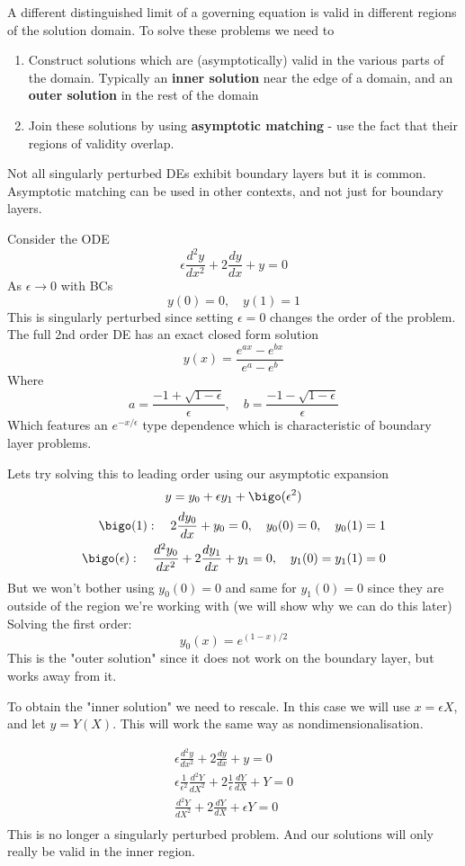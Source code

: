 \documentclass{/home/janmebows/Documents/LatexTemplates/myassignment}
\begin{document}
A different distinguished limit of a governing equation is valid in different regions of the solution domain. To solve these problems we need to
\begin{enumerate}
    \item Construct solutions which are (asymptotically) valid in the various parts of the domain. Typically an \textbf{inner solution} near the edge of a domain, and an \textbf{outer solution} in the rest of the domain
    \item Join these solutions by using \textbf{asymptotic matching} - use the fact that their regions of validity overlap.
    
\end{enumerate}
Not all singularly perturbed DEs exhibit boundary layers but it is common. Asymptotic matching can be used in other contexts, and not just for boundary layers.

Consider the ODE
\[\epsilon \frac{d^2y}{dx^2} + 2\frac{dy}{dx} +y =0\]
As $\epsilon \to 0$ with BCs
\[y(0) = 0,\quad y(1)=1\]
This is singularly perturbed since setting $\epsilon = 0$ changes the order of the problem.
The full 2nd order DE has an exact closed form solution
\[y(x) = \frac{e^{ax} - e^{bx}}{e^a - e^b}\]
Where
\[a = \frac{-1+\sqrt{1-\epsilon}}\epsilon , \quad b = \frac{-1-\sqrt{1-\epsilon}}\epsilon \]
Which features an $e^{-x/\epsilon}$ type dependence which is characteristic of boundary layer problems.

Lets try solving this to leading order using our asymptotic expansion
\[y = y_0 + \epsilon y_1 + \bigo(\epsilon^2)\]
\begin{align*}
    \bigo(1):\quad 2 \frac{dy_0}{dx} + y_0 = 0,\quad y_0(0) = 0,\quad y_0(1)=1\\
    \bigo(\epsilon):\quad \frac{d^2y_0}{dx^2} + 2 \frac{dy_1}{dx} + y_1 = 0,\quad y_1(0)=y_1(1)=0
\end{align*}
But we won't bother using $y_0(0)=0$ and same for $y_1(0)=0$ since they are outside of the region we're working with (we will show why we can do this later)
Solving the first order:
\[y_0(x) = e^{(1-x)/2}\]
This is the "outer solution" since it does not work on the boundary layer, but works away from it.

To obtain the "inner solution" we need to rescale. In this case we will use $x = \epsilon X$, and let $y = Y(X)$. This will work the same way as nondimensionalisation.

\begin{align*}
    \epsilon \frac{d^2y}{dx^2} + 2\frac{dy}{dx} + y= 0\\
    \epsilon \frac1{\epsilon^2}\frac{d^2Y}{dX^2} + 2 \frac{1}{\epsilon} \frac{dY}{dX} + Y = 0\\
    \frac{d^2Y}{dX^2} + 2 \frac{dY}{dX} + \epsilon Y = 0\\
\end{align*}
This is no longer a singularly perturbed problem. And our solutions will only really be valid in the inner region.
\end{document}
